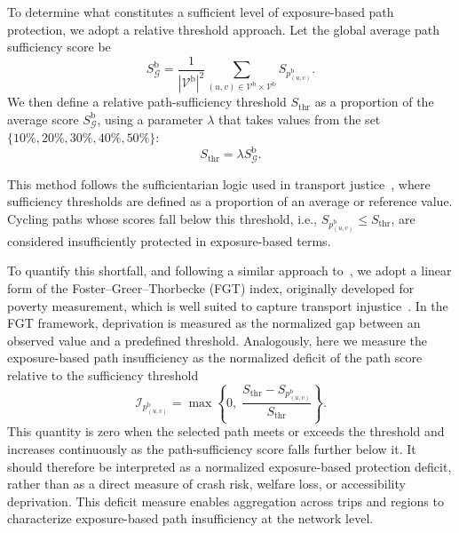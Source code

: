 \documentclass[lettersize,journal]{IEEEtran}
\begin{document}
To determine what constitutes a sufficient level of exposure-based path protection, we adopt a relative threshold approach. Let the global average path sufficiency score be
\begin{equation}
    S_{\mathcal{G}}^\mathrm{b}
    =
    \frac{1}{|\mathcal{V}^\mathrm{b}|^2}
    \sum_{(u,v) \in \mathcal{V}^\mathrm{b} \times \mathcal{V}^\mathrm{b}}
    S_{p_{(u,v)}^\mathrm{b}}.
\end{equation}
We then define a relative path-sufficiency threshold $S_{\text{thr}}$ as a proportion of the average score $S_{\mathcal{G}}^\mathrm{b}$, using a parameter $\lambda$ that takes values from the set $\{10\%, 20\%, 30\%, 40\%, 50\%\}$:
\begin{equation}
    S_{\text{thr}} = \lambda S_{\mathcal{G}}^\mathrm{b}.
\end{equation}

This method follows the sufficientarian logic used in transport justice~\cite{martens2017transport,martens2022equity}, where sufficiency thresholds are defined as a proportion of an average or reference value. Cycling paths whose scores fall below this threshold, i.e., $S_{p_{(u,v)}^\mathrm{b}} \leq S_{\text{thr}}$, are considered insufficiently protected in exposure-based terms.

To quantify this shortfall, and following a similar approach to~\cite{salazar2024accessibility}, we adopt a linear form of the Foster--Greer--Thorbecke (FGT) index, originally developed for poverty measurement, which is well suited to capture transport injustice~\cite{martens2017transport, pereira2017distributive}. In the FGT framework, deprivation is measured as the normalized gap between an observed value and a predefined threshold. Analogously, here we measure the exposure-based path insufficiency as the normalized deficit of the path score relative to the sufficiency threshold
\begin{equation}
    \mathcal{I}_{p_{(u,v)}^\mathrm{b}}
    =
    \max \left\{
    0,\;
    \frac{S_{\text{thr}} - S_{p_{(u,v)}^\mathrm{b}}}{S_{\text{thr}}}
    \right\}.
\end{equation}
This quantity is zero when the selected path meets or exceeds the threshold and increases continuously as the path-sufficiency score falls further below it. It should therefore be interpreted as a normalized exposure-based protection deficit, rather than as a direct measure of crash risk, welfare loss, or accessibility deprivation. This deficit measure enables aggregation across trips and regions to characterize exposure-based path insufficiency at the network level.
\end{document}
